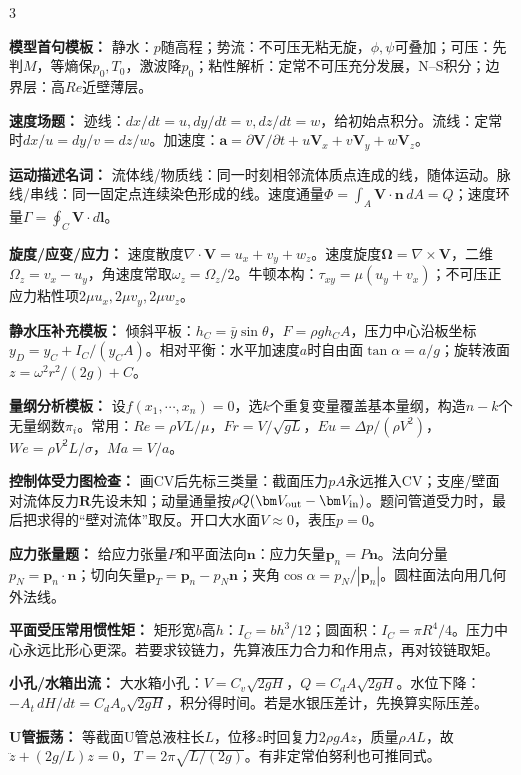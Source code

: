 \documentclass[a4paper]{article}
\newcommand{\sect}[1]{\par{\bfseries\color{Q}#1：}}
\begin{document}
\begin{multicols}{3}
{\sect{模型首句模板}
静水：$p$随高程；势流：不可压无粘无旋，$\phi,\psi$可叠加；可压：先判$M$，等熵保$p_0,T_0$，激波降$p_0$；粘性解析：定常不可压充分发展，N--S积分；边界层：高$Re$近壁薄层。
\sect{速度场题}
迹线：$dx/dt=u,dy/dt=v,dz/dt=w$，给初始点积分。流线：定常时$dx/u=dy/v=dz/w$。加速度：$\bm a=\partial\bm V/\partial t+u\bm V_x+v\bm V_y+w\bm V_z$。
\sect{运动描述名词}
流体线/物质线：同一时刻相邻流体质点连成的线，随体运动。脉线/串线：同一固定点连续染色形成的线。速度通量$\Phi=\int_A\bm V\cdot\bm n\,dA=Q$；速度环量$\Gamma=\oint_C\bm V\cdot d\bm l$。
\sect{旋度/应变/应力}
速度散度$\nabla\cdot\bm V=u_x+v_y+w_z$。速度旋度$\bm\Omega=\nabla\times\bm V$，二维$\Omega_z=v_x-u_y$，角速度常取$\omega_z=\Omega_z/2$。牛顿本构：$\tau_{xy}=\mu(u_y+v_x)$；不可压正应力粘性项$2\mu u_x,2\mu v_y,2\mu w_z$。
\sect{静水压补充模板}
倾斜平板：$h_C=\bar y\sin\theta$，$F=\rho gh_CA$，压力中心沿板坐标$y_D=y_C+I_C/(y_CA)$。相对平衡：水平加速度$a$时自由面$\tan\alpha=a/g$；旋转液面$z=\omega^2r^2/(2g)+C$。
\sect{量纲分析模板}
设$f(x_1,\cdots,x_n)=0$，选$k$个重复变量覆盖基本量纲，构造$n-k$个无量纲数$\pi_i$。常用：$Re=\rho VL/\mu$，$Fr=V/\sqrt{gL}$，$Eu=\Delta p/(\rho V^2)$，$We=\rho V^2L/\sigma$，$Ma=V/a$。
\sect{控制体受力图检查}
画CV后先标三类量：截面压力$pA$永远推入CV；支座/壁面对流体反力$\bm R$先设未知；动量通量按$\rho Q(\bm V_{\rm out}-\bm V_{\rm in})$。题问管道受力时，最后把求得的“壁对流体”取反。开口大水面$V\approx0$，表压$p=0$。
\sect{应力张量题}
给应力张量$P$和平面法向$\bm n$：应力矢量$\bm p_n=P\bm n$。法向分量$p_N=\bm p_n\cdot\bm n$；切向矢量$\bm p_T=\bm p_n-p_N\bm n$；夹角$\cos\alpha=p_N/|\bm p_n|$。圆柱面法向用几何外法线。
\sect{平面受压常用惯性矩}
矩形宽$b$高$h$：$I_C=bh^3/12$；圆面积：$I_C=\pi R^4/4$。压力中心永远比形心更深。若要求铰链力，先算液压力合力和作用点，再对铰链取矩。
\sect{小孔/水箱出流}
大水箱小孔：$V=C_v\sqrt{2gH}$，$Q=C_dA\sqrt{2gH}$。水位下降：$-A_t\,dH/dt=C_dA_o\sqrt{2gH}$，积分得时间。若是水银压差计，先换算实际压差。
\sect{U管振荡}
等截面U管总液柱长$L$，位移$z$时回复力$2\rho gAz$，质量$\rho AL$，故$\ddot z+(2g/L)z=0$，$T=2\pi\sqrt{L/(2g)}$。有非定常伯努利也可推同式。
}


\end{multicols}
\end{document}
